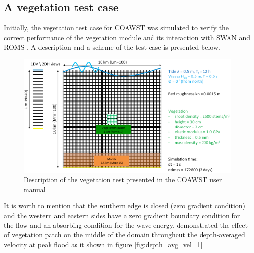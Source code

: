 \documentclass[12pt]{article}
\begin{document}
\subsection{A vegetation test case}

Initially, the vegetation test case for COAWST was simulated to verify the correct performance of the vegetation module and its interaction with SWAN and ROMS \parencite{Beudin2017}. A description and a scheme of the test case is presented below. 

\begin{figure}[H]
    \centering
    \includegraphics[scale=0.6]{plots/vegetation_test.png}
    \caption{Description of the vegetation test presented in the COAWST user manual \parencite{Warner2010}}
    \label{fig:veg_test_scheme}
\end{figure}

It is worth to mention that the southern edge is closed (zero gradient condition) and the western and eastern sides have a zero gradient boundary condition for the flow and an absorbing condition for the wave energy. \textcite{Beudin2017} demonstrated the effect of vegetation patch on the middle of the domain throughout the depth-averaged velocity at peak flood as it shown in figure \ref{fig:depth_avg_vel_1}
\end{document}
